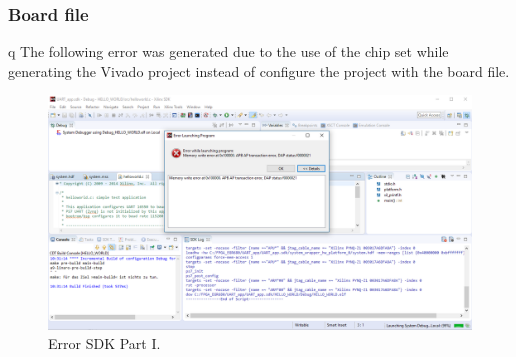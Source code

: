 \subsubsection{Board file}\label{subsubsec: Board fil}q
The following error was generated due to the use of the chip set while generating the Vivado project instead of configure the project with the board file. 
\begin{figure}[H]
	\centering
	\includegraphics[width=1.0\textwidth]{01_images/Vivado_lab4_part1_SecondErrorSDK.PNG}
	\caption{Error SDK Part I.}
	\label{fig: Vivado_lab4_part1_SecondErrorSDK}
\end{figure}

